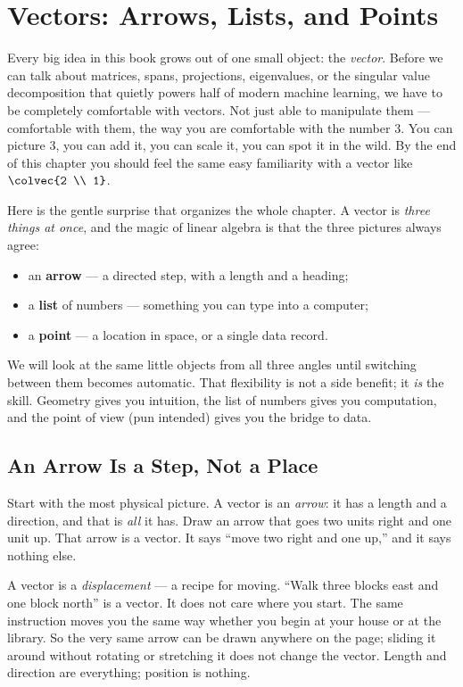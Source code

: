 \chapter{Vectors: Arrows, Lists, and Points}

Every big idea in this book grows out of one small object: the \emph{vector}. Before
we can talk about matrices, spans, projections, eigenvalues, or the singular value
decomposition that quietly powers half of modern machine learning, we have to be
completely comfortable with vectors. Not just able to manipulate them --- comfortable
with them, the way you are comfortable with the number $3$. You can picture $3$, you
can add it, you can scale it, you can spot it in the wild. By the end of this chapter
you should feel the same easy familiarity with a vector like $\colvec{2 \\ 1}$.

Here is the gentle surprise that organizes the whole chapter. A vector is \emph{three
things at once}, and the magic of linear algebra is that the three pictures always
agree:

\begin{itemize}
  \item an \textbf{arrow} --- a directed step, with a length and a heading;
  \item a \textbf{list} of numbers --- something you can type into a computer;
  \item a \textbf{point} --- a location in space, or a single data record.
\end{itemize}

We will look at the same little objects from all three angles until switching between
them becomes automatic. That flexibility is not a side benefit; it \emph{is} the skill.
Geometry gives you intuition, the list of numbers gives you computation, and the point
of view (pun intended) gives you the bridge to data.

\section{An Arrow Is a Step, Not a Place}
\label{ch02:arrow}

Start with the most physical picture. A vector is an \emph{arrow}: it has a length and a
direction, and that is \emph{all} it has. Draw an arrow that goes two units right and
one unit up. That arrow is a vector. It says ``move two right and one up,'' and it says
nothing else.

\begin{intuitionbox}
A vector is a \emph{displacement} --- a recipe for moving. ``Walk three blocks east and
one block north'' is a vector. It does not care where you start. The same instruction
moves you the same way whether you begin at your house or at the library. So the very
same arrow can be drawn anywhere on the page; sliding it around without rotating or
stretching it does not change the vector. Length and direction are everything; position
is nothing.
\end{intuitionbox}

